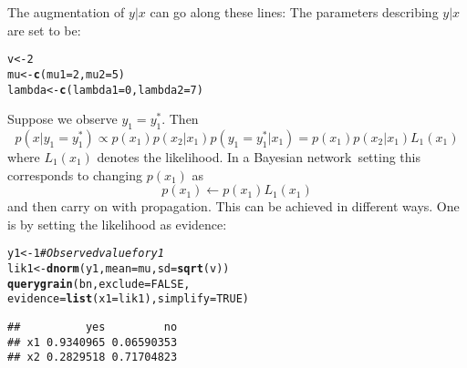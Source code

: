 \documentclass[10pt]{article}\usepackage[]{graphicx}\usepackage[]{xcolor}
\makeatletter
\newcommand{\hlnum}[1]{\textcolor[rgb]{0.686,0.059,0.569}{#1}}%
\newcommand{\hlcom}[1]{\textcolor[rgb]{0.678,0.584,0.686}{\textit{#1}}}%
\newcommand{\hlstd}[1]{\textcolor[rgb]{0.345,0.345,0.345}{#1}}%
\newcommand{\hlkwb}[1]{\textcolor[rgb]{0.69,0.353,0.396}{#1}}%
\newcommand{\hlkwc}[1]{\textcolor[rgb]{0.333,0.667,0.333}{#1}}%
\newcommand{\hlkwd}[1]{\textcolor[rgb]{0.737,0.353,0.396}{\textbf{#1}}}%
\newenvironment{kframe}{%
 \def\at@end@of@kframe{}%
 \ifinner\ifhmode%
  \def\at@end@of@kframe{\end{minipage}}%
  \begin{minipage}{\columnwidth}%
 \fi\fi%
 \def\FrameCommand##1{\hskip\@totalleftmargin \hskip-\fboxsep
 \colorbox{shadecolor}{##1}\hskip-\fboxsep
     \hskip-\linewidth \hskip-\@totalleftmargin \hskip\columnwidth}%
 \MakeFramed {\advance\hsize-\width
   \@totalleftmargin\z@ \linewidth\hsize
   \@setminipage}}%
 {\par\unskip\endMakeFramed%
 \at@end@of@kframe}
\newenvironment{knitrout}{}{} %
\def\bn{Bayesian network}
\makeatother
\begin{document}
The augmentation of $y|x$ can go along these lines: The parameters describing $y|x$ are set to be:
\begin{knitrout}
\color{fgcolor}\begin{kframe}
\begin{alltt}
\hlstd{v} \hlkwb{<-} \hlnum{2}
\hlstd{mu} \hlkwb{<-} \hlkwd{c}\hlstd{(}\hlkwc{mu1}\hlstd{=}\hlnum{2}\hlstd{,} \hlkwc{mu2}\hlstd{=}\hlnum{5}\hlstd{)}
\hlstd{lambda} \hlkwb{<-} \hlkwd{c}\hlstd{(}\hlkwc{lambda1}\hlstd{=}\hlnum{0}\hlstd{,} \hlkwc{lambda2}\hlstd{=}\hlnum{7}\hlstd{)}
\end{alltt}
\end{kframe}
\end{knitrout}

Suppose we observe $y_1 = y_1^*$. Then
\begin{displaymath}
  p(x|y_1= y_1^*)\propto p(x_1)p(x_2|x_1) p(y_1=y_1^*|x_1) =  p(x_1)p(x_2|x_1) L_1(x_1)
\end{displaymath}
where $L_1(x_1)$ denotes the likelihood. In a \bn\ setting this
corresponds to changing $p(x_1)$ as
\begin{displaymath}
  p(x_1) \leftarrow p(x_1)L_1(x_1)
\end{displaymath}
and then carry on with propagation. This can be achieved in different ways. One is by setting the likelihood as evidence:

\begin{knitrout}
\color{fgcolor}\begin{kframe}
\begin{alltt}
\hlstd{y1} \hlkwb{<-} \hlnum{1} \hlcom{# Observed value for y1}
\hlstd{lik1} \hlkwb{<-} \hlkwd{dnorm}\hlstd{(y1,} \hlkwc{mean}\hlstd{=mu,} \hlkwc{sd}\hlstd{=}\hlkwd{sqrt}\hlstd{(v))}
\hlkwd{querygrain}\hlstd{(bn,} \hlkwc{exclude} \hlstd{=} \hlnum{FALSE}\hlstd{,}
           \hlkwc{evidence}\hlstd{=}\hlkwd{list}\hlstd{(}\hlkwc{x1}\hlstd{=lik1),} \hlkwc{simplify} \hlstd{=} \hlnum{TRUE}\hlstd{)}
\end{alltt}
\begin{verbatim}
##          yes         no
## x1 0.9340965 0.06590353
## x2 0.2829518 0.71704823
\end{verbatim}
\end{kframe}
\end{knitrout}
\end{document}
